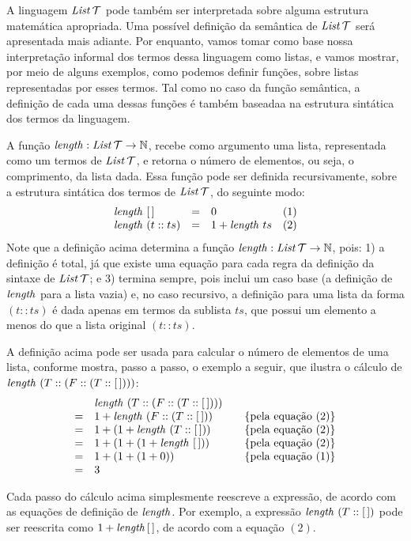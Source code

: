 A linguagem $\textit{List\/}\,\mathcal{T}$ pode também ser interpretada sobre alguma estrutura matemática apropriada. Uma possível definição da  semântica de $\textit{List\/}\,\mathcal{T}$ será  apresentada mais adiante. Por enquanto, vamos tomar como base nossa interpretação informal dos termos dessa linguagem como listas, e vamos mostrar, por meio de alguns exemplos, como podemos definir funções, sobre listas representadas por esses termos. Tal como no caso da função semântica, a definição de cada uma dessas funções é também baseadaa na estrutura sintática dos termos da linguagem.

\begin{Definition}
A função $\textit{length\/} : \textit{List\/}\,\mathcal{T} \rightarrow \mathbb{N}$, recebe como argumento uma lista, representada como um termos de $\textit{List\/}\,\mathcal{T}$, e retorna o número de elementos, ou seja, o comprimento, da lista dada. Essa função pode ser definida recursivamente, sobre a estrutura sintática dos termos de $\textit{List\/}\,\mathcal{T}$, do seguinte modo:
\[
\begin{array}{lclr}
  \textit{length\/}\,\,[\,] & = & 0 & (1)\\
  \textit{length\/}\,\,(t :: ts) & = & 1 + \textit{length\/}\,\, ts & (2)
\end{array}
\]
Note que a definição acima determina a função $\textit{length\/} : \textit{List\/}\,\mathcal{T} \rightarrow \mathbb{N}$, pois: 1) a definição \'e total, já que existe uma equação para cada regra da definição da sintaxe de $\textit{List\/}\,\mathcal{T}$; e 3) termina sempre, pois inclui um caso base (a definição de $\textit{length\/}$ para a lista vazia) e, no caso recursivo, a definição para uma lista da forma $(t :: ts)$ é dada apenas em termos da sublista $ts$, que possui um elemento a menos do que a lista original $(t::ts)$.
\end{Definition}

\begin{Example}
A definição acima pode ser usada para calcular o n\'umero de elementos de uma lista, conforme mostra, passo a passo, o exemplo a seguir, que ilustra o cálculo de $\textit{length\/}\,\,(T :: (F :: (T :: [\,])))$:
\[
\begin{array}{llcl}
& \length\,\,(T :: (F :: (T :: [\,]))) &  & \\
= &1 + \length\,\,(F :: (T :: [\,]))  & & \{\text{pela equa\c{c}\~ao }(2)\}\\
= &1 + (1 + \length\,\,(T :: [\,]))  &  & \{\text{pela equa\c{c}\~ao }(2)\}\\
= &1 + (1 + (1 + \length\,\,[\,]))  &  & \{\text{pela equa\c{c}\~ao }(2)\}\\
= &1 + (1 + (1 + 0))  &  & \{\text{pela equa\c{c}\~ao }(1)\}\\
= &3                  &   & 
\end{array}
\]
\end{Example}
Cada passo do cálculo acima simplesmente reescreve a express\~ao, de acordo com as equa\c{c}\~oes de definição de $\textit{length\/}$. Por exemplo, a expressão $\textit{length\/}\,\,(T :: [\,])$  pode ser reescrita como $1 + \textit{length\/}\, [\,]$, de acordo com a equa\c{c}\~ao $(2)$.


